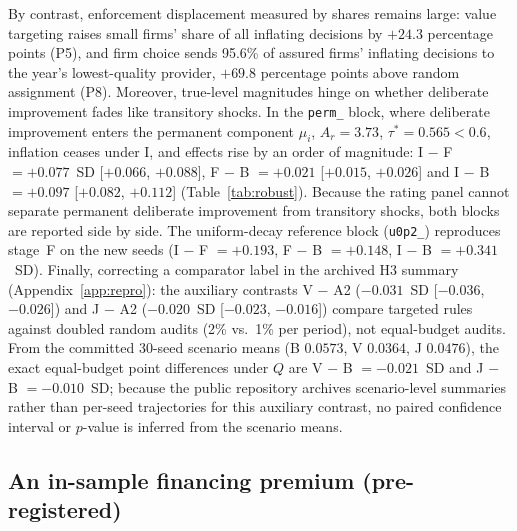\documentclass[11pt]{article}
\begin{document}
By contrast, enforcement displacement measured by shares remains large: value targeting raises small firms' share of all inflating decisions by $+24.3$ percentage points (P5), and firm choice sends 95.6\% of assured firms' inflating decisions to the year's lowest-quality provider, $+69.8$ percentage points above random assignment (P8). Moreover, true-level magnitudes hinge on whether deliberate improvement fades like transitory shocks. In the \texttt{perm\_} block, where deliberate improvement enters the permanent component $\mu_i$, $A_r = 3.73$, $\tau^* = 0.565 < 0.6$, inflation ceases under I, and effects rise by an order of magnitude: I $-$ F $= +0.077$~SD [$+0.066$, $+0.088$], F $-$ B $= +0.021$ [$+0.015$, $+0.026$] and I $-$ B $= +0.097$ [$+0.082$, $+0.112$] (Table~\ref{tab:robust}). Because the rating panel cannot separate permanent deliberate improvement from transitory shocks, both blocks are reported side by side. The uniform-decay reference block (\texttt{u0p2\_}) reproduces stage~F on the new seeds (I $-$ F $= +0.193$, F $-$ B $= +0.148$, I $-$ B $= +0.341$~SD). Finally, correcting a comparator label in the archived H3 summary (Appendix~\ref{app:repro}): the auxiliary contrasts V $-$ A2 ($-0.031$~SD [$-0.036$, $-0.026$]) and J $-$ A2 ($-0.020$~SD [$-0.023$, $-0.016$]) compare targeted rules against doubled random audits (2\% vs.\ 1\% per period), not equal-budget audits. From the committed 30-seed scenario means (B $0.0573$, V $0.0364$, J $0.0476$), the exact equal-budget point differences under $Q$ are V $-$ B $= -0.021$~SD and J $-$ B $= -0.010$~SD; because the public repository archives scenario-level summaries rather than per-seed trajectories for this auxiliary contrast, no paired confidence interval or $p$-value is inferred from the scenario means.

\subsection{An in-sample financing premium (pre-registered)}\label{app:financing}
\end{document}
